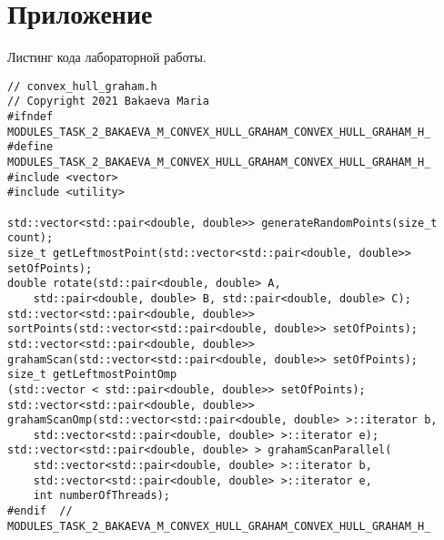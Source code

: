 \documentclass{report}
\begin{document}
\section*{Приложение}
Листинг кода лабораторной работы.
\begin{lstlisting}
// convex_hull_graham.h
// Copyright 2021 Bakaeva Maria
#ifndef MODULES_TASK_2_BAKAEVA_M_CONVEX_HULL_GRAHAM_CONVEX_HULL_GRAHAM_H_
#define MODULES_TASK_2_BAKAEVA_M_CONVEX_HULL_GRAHAM_CONVEX_HULL_GRAHAM_H_
#include <vector>
#include <utility>

std::vector<std::pair<double, double>> generateRandomPoints(size_t count);
size_t getLeftmostPoint(std::vector<std::pair<double, double>> setOfPoints);
double rotate(std::pair<double, double> A,
    std::pair<double, double> B, std::pair<double, double> C);
std::vector<std::pair<double, double>>
sortPoints(std::vector<std::pair<double, double>> setOfPoints);
std::vector<std::pair<double, double>>
grahamScan(std::vector<std::pair<double, double>> setOfPoints);
size_t getLeftmostPointOmp
(std::vector < std::pair<double, double>> setOfPoints);
std::vector<std::pair<double, double>>
grahamScanOmp(std::vector<std::pair<double, double> >::iterator b,
    std::vector<std::pair<double, double> >::iterator e);
std::vector<std::pair<double, double> > grahamScanParallel(
    std::vector<std::pair<double, double> >::iterator b,
    std::vector<std::pair<double, double> >::iterator e,
    int numberOfThreads);
#endif  // MODULES_TASK_2_BAKAEVA_M_CONVEX_HULL_GRAHAM_CONVEX_HULL_GRAHAM_H_
\end{lstlisting}
\end{document}
